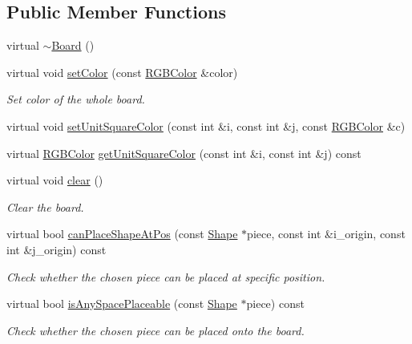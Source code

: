 \subsection*{Public Member Functions}
\begin{DoxyCompactItemize}
\item 
virtual \mbox{\hyperlink{class_board_af73f45730119a1fd8f6670f53f959e68}{$\sim$\+Board}} ()
\item 
virtual void \mbox{\hyperlink{class_board_afa3fa04776e43db38f3f1dd9bba28e6e}{set\+Color}} (const \mbox{\hyperlink{class_r_g_b_color}{R\+G\+B\+Color}} \&color)
\begin{DoxyCompactList}\small\item\em Set color of the whole board. \end{DoxyCompactList}\item 
virtual void \mbox{\hyperlink{class_board_a9c8fc3e645f56bec246a27459f5c75ec}{set\+Unit\+Square\+Color}} (const int \&i, const int \&j, const \mbox{\hyperlink{class_r_g_b_color}{R\+G\+B\+Color}} \&c)
\item 
virtual \mbox{\hyperlink{class_r_g_b_color}{R\+G\+B\+Color}} \mbox{\hyperlink{class_board_a6e6a947ec66c09bff4559fd9650b9b1d}{get\+Unit\+Square\+Color}} (const int \&i, const int \&j) const
\item 
virtual void \mbox{\hyperlink{class_board_af74f0d4b43e5aa3faea16d7c6407b05e}{clear}} ()
\begin{DoxyCompactList}\small\item\em Clear the board. \end{DoxyCompactList}\item 
virtual bool \mbox{\hyperlink{class_board_a497025aedeebf35030eb7e99972de4e1}{can\+Place\+Shape\+At\+Pos}} (const \mbox{\hyperlink{class_shape}{Shape}} $\ast$piece, const int \&i\+\_\+origin, const int \&j\+\_\+origin) const
\begin{DoxyCompactList}\small\item\em Check whether the chosen piece can be placed at specific position. \end{DoxyCompactList}\item 
virtual bool \mbox{\hyperlink{class_board_a0bf419d10b557cd2119ba7f2fcec7471}{is\+Any\+Space\+Placeable}} (const \mbox{\hyperlink{class_shape}{Shape}} $\ast$piece) const
\begin{DoxyCompactList}\small\item\em Check whether the chosen piece can be placed onto the board. \end{DoxyCompactList}\item 

\end{DoxyCompactItemize}
